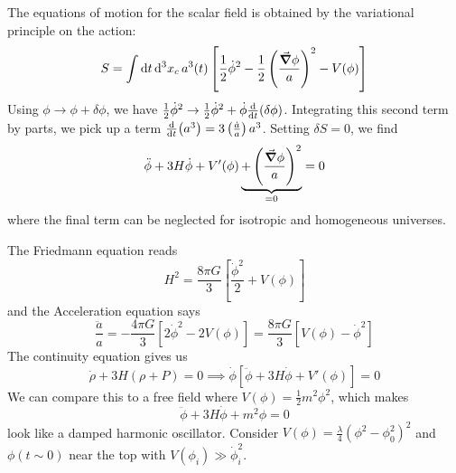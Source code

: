 \documentclass[a4paper,twoside,master.tex]{subfiles}
\begin{document}
The equations of motion for the scalar field is obtained by the variational principle on the action:
\begin{equation}
    S = \int \dd{t} \dd[3]{x_c} a^3(t) \left[ \frac{1}{2} \dot{\phi}^2 - \frac{1}{2} \left( \frac{\grad{\phi}}{a} \right)^2 - V(\phi) \right]
\end{equation}
Using $ \phi \to \phi + \delta \phi $, we have $ \frac{1}{2} \dot{\phi}^2 \to \frac{1}{2} \dot{\phi}^2 + \dot{\phi} \dv{t}(\delta \phi) $. Integrating this second term by parts, we pick up a term $ \dv{t}(a^3)= 3 \left( \frac{\dot{a}}{a} \right)a^3 $. Setting $ \delta S = 0 $, we find
\begin{equation}
    \ddot{\phi} + 3 H \dot{\phi} + V'(\phi) \underbrace{+ \left( \frac{\grad{\phi}}{a} \right)^2}_{=0} = 0
\end{equation}
where the final term can be neglected for isotropic and homogeneous universes.

The Friedmann equation reads
\begin{equation}
    H^2 = \frac{8 \pi G}{3} \left[ \frac{\dot{\phi}^2}{2} + V(\phi) \right]
\end{equation}
and the Acceleration equation says
\begin{equation}
    \frac{\ddot{a}}{a} = - \frac{4 \pi G}{3} \left[ 2 \dot{\phi}^2 - 2 V(\phi) \right] = \frac{8 \pi G}{3} \left[ V(\phi) - \dot{\phi}^2 \right]
\end{equation}
The continuity equation gives us
\begin{equation}
    \dot{\rho} + 3H(\rho + P) = 0 \implies \dot{\phi} \left[ \ddot{\phi} + 3H \dot{\phi} + V'(\phi) \right] = 0
\end{equation}
We can compare this to a free field where $ V(\phi) = \frac{1}{2} m^2 \phi^2 $, which makes
\begin{equation}
    \ddot{\phi} + 3 H \dot{\phi} + m^2 \phi = 0
\end{equation}
look like a damped harmonic oscillator. Consider $ V(\phi) = \frac{\lambda}{4} (\phi^2 - \phi_0^2)^2 $ and $ \phi(t \sim 0) $ near the top with $ V(\phi_i) \gg \dot{\phi}_i^2 $.
\end{document}

